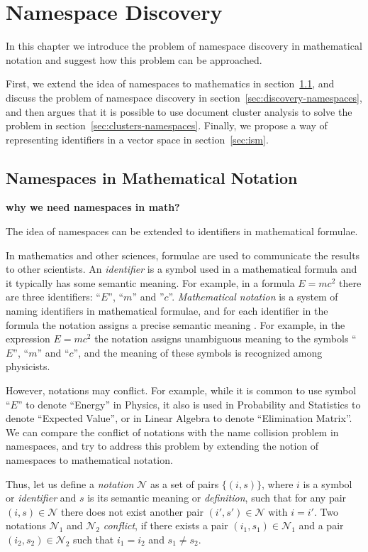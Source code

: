\section{Namespace Discovery}

In this chapter we introduce the problem of namespace discovery in 
mathematical notation and suggest how this problem can be approached. 

First, we extend the idea of namespaces to mathematics in section~\ref{sec:math-namespaces},
and discuss the problem of namespace discovery in section~\ref{sec:discovery-namespaces},
and then argues that it is possible to use document cluster analysis 
to solve the problem in section~\ref{sec:clusters-namespaces}. 
Finally, we propose a way of representing identifiers in a vector space 
in section~\ref{sec:ism}.


\subsection{Namespaces in Mathematical Notation} \label{sec:math-namespaces}

\textbf{why we need namespaces in math?}

The idea of namespaces can be extended to identifiers in mathematical
formulae. 

In mathematics and other sciences, formulae are used to communicate the results 
to other scientists. An \emph{identifier} is a symbol used in a mathematical 
formula and it typically has some semantic meaning. For example, in a formula 
$E = m c^2$ there are three identifiers: ``$E$'', ``$m$'' and ''$c$''.
\emph{Mathematical notation} is a system of naming identifiers in
mathematical formulae, and for each identifier in the formula the notation assigns
a precise semantic meaning \cite{wikinotation}. For example, in the expression
$E = mc^2$ the notation assigns
unambiguous meaning to the symbols ``$E$'', ``$m$'' and ``$c$'', and the
meaning of these symbols is recognized among physicists.

However, notations may conflict. For example, while it is common to use
symbol ``$E$'' to denote ``Energy'' in Physics, it also is used in Probability and
Statistics to denote ``Expected Value'', or in Linear Algebra to denote
``Elimination Matrix''.
We can compare the conflict of notations with the name collision problem
in namespaces, and try to address this problem by extending the notion of
namespaces to mathematical notation.

Thus, let us define a \emph{notation} $\mathcal N$ as a set of pairs $\{ (i, s) \}$,
where $i$ is a symbol or \emph{identifier} and $s$ is its semantic meaning
or \emph{definition}, such that for any pair $(i, s) \in \mathcal N$ there
does not exist another pair $(i', s') \in \mathcal N$ with $i = i'$.
Two notations $\mathcal N_1$ and $\mathcal N_2$
\emph{conflict}, if there exists a pair $(i_1, s_1) \in \mathcal N_1$ and a pair
$(i_2, s_2) \in \mathcal N_2$ such that $i_1 = i_2$ and $s_1 \ne s_2$.

